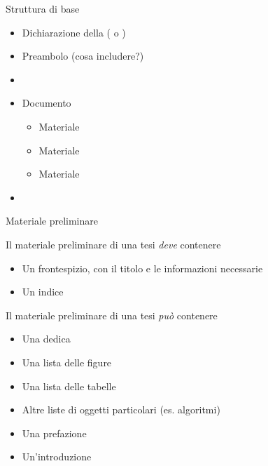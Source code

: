 \documentclass{beamer}
\subtitle{Parte 4: Scrivere una tesi di laurea con Latex}
\begin{document}
\begin{frame}
\titlepage
\end{frame}

\begin{frame}{Struttura di base}
\begin{itemize}
\item Dichiarazione della  ( o )
\item Preambolo (cosa includere?)
\item {}
\item Documento
\begin{itemize}
\item Materiale 
\item Materiale 
\item Materiale 
\end{itemize}
\item {}
\end{itemize}
\end{frame}

\begin{frame}{Materiale preliminare}

\begin{block}{Il materiale preliminare di una tesi \textit{deve} contenere}
\begin{itemize}
\item Un frontespizio, con il titolo e le informazioni necessarie
\item Un indice
\end{itemize}
\end{block}

\begin{block}{Il materiale preliminare di una tesi \textit{pu\`o} contenere}
\begin{itemize}
\item Una dedica
\item Una lista delle figure
\item Una lista delle tabelle
\item Altre liste di oggetti particolari (es. algoritmi)
\item Una prefazione
\item Un'introduzione
\end{itemize}
\end{block}

\end{frame}
\end{document}
